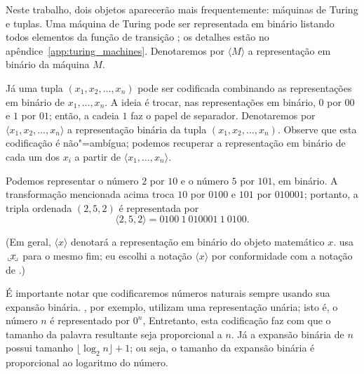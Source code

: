 Neste trabalho,
dois objetos aparecerão mais frequentemente:
máquinas de Turing e tuplas.
Uma máquina de Turing pode ser representada em binário
listando todos elementos da função de transição
\cite[p.~182]{HopcroftUllman1979};
os detalhes estão no apêndice~\ref{app:turing_machines}.
Denotaremos por $\langle M \rangle$ a representação em binário da máquina $M$.

Já uma tupla $(x_1, x_2, \dots, x_n)$ pode ser codificada
combinando as representações em binário de $x_1, \dots, x_n$.
A ideia é trocar, nas representações em binário,
$0$ por $00$ e $1$ por $01$;
então, a cadeia $1$ faz o papel de separador.
Denotaremos por $\langle x_1, x_2, \dots, x_n \rangle$
a representação binária da tupla $(x_1, x_2, \dots, x_n)$.
Observe que esta codificação é não"=ambígua;
podemos recuperar a representação em binário de cada um dos $x_i$
a partir de $\langle x_1, \dots, x_n \rangle$.

\begin{example}
    Podemos representar o número $2$ por $10$ e o número $5$ por $101$,
    em binário.
    A transformação mencionada acima troca $10$ por $0100$
    e $101$ por $010001$;
    portanto, a tripla ordenada $(2, 5, 2)$ é representada por
    \begin{equation*}
        \langle 2, 5, 2 \rangle = 0100\ 1\ 010001\ 1\ 0100.
    \end{equation*}
\end{example}

(Em geral, $\langle x \rangle$ denotará a representação em binário
do objeto matemático $x$.
 usa
$\sideset{_\llcorner}{_\lrcorner}{\mathop{\makebox[0.5ex]{$x$}}}$
para o mesmo fim;
eu escolhi a notação $\langle x \rangle$
por conformidade com a notação de .)


É importante notar que codificaremos números naturais
sempre usando sua expansão binária.
,
por exemplo,
utilizam uma representação unária;
isto é, o número $n$ é representado por $0^n$,
Entretanto,
esta codificação faz com que o tamanho da palavra resultante
seja proporcional a $n$.
Já a expansão binária de $n$ possui tamanho $\lfloor \log_2 n \rfloor + 1$;
ou seja, o tamanho da expansão binária é proporcional ao logaritmo do número.


